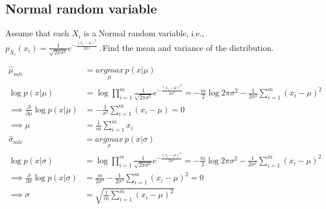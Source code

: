 \documentclass[12pt]{article}
\begin{document}
\subsection{Normal random variable}
Assume that each $X_i$ is a Normal random variable, i.e.,\, $p_{X_i}(x_i)=\frac{1}{\sqrt{2\pi\sigma^2}} e^{-\frac{(x_i-\mu)^2}{2\sigma^2}}$\,.\,Find the mean and variance of the distribution.
\begin{qsolve}
    \begin{align*}
        \hat{\mu}_{mle}                                      & = \underset{\mu}{argmax} \, p(x|\mu)                                                                                                                                  \\
        \log p(x|\mu)                                        & = \log \prod_{i=1}^m \frac{1}{\sqrt{2\pi\sigma^2}} e^{-\frac{(x_i-\mu)^2}{2\sigma^2}} = -\frac{m}{2} \log 2\pi\sigma^2 - \frac{1}{2\sigma^2} \sum_{i=1}^m (x_i-\mu)^2 \\
        \implies \frac{\partial}{\partial \mu} \log p(x|\mu) & = -\frac{1}{\sigma^2} \sum_{i=1}^m (x_i-\mu) = 0                                                                                                                      \\
        \implies \mu                                         & = \frac{1}{m} \sum_{i=1}^m x_i
    \end{align*}
    \begin{align*}
        \hat{\sigma}_{mle}                                         & = \underset{\sigma}{argmax} \, p(x|\sigma)                                                                                                                            \\
        \log p(x|\sigma)                                           & = \log \prod_{i=1}^m \frac{1}{\sqrt{2\pi\sigma^2}} e^{-\frac{(x_i-\mu)^2}{2\sigma^2}} = -\frac{m}{2} \log 2\pi\sigma^2 - \frac{1}{2\sigma^2} \sum_{i=1}^m (x_i-\mu)^2 \\
        \implies \frac{\partial}{\partial \sigma} \log p(x|\sigma) & = \frac{m}{2\sigma^3} - \frac{1}{2\sigma^3} \sum_{i=1}^m (x_i-\mu)^2 = 0                                                                                              \\
        \implies \sigma                                            & = \sqrt{\frac{1}{m} \sum_{i=1}^m (x_i-\mu)^2}
    \end{align*}
\end{qsolve}

\makeendpage
\end{document}
